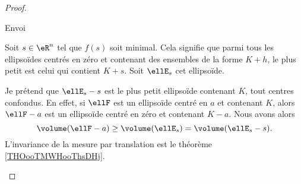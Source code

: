 \begin{proof}
\begin{subproof}
        \item[Envoi]

            Soit \( s\in \eR^n\) tel que \( f(s)\) soit minimal. Cela signifie que parmi tous les ellipsoïdes centrés en zéro et contenant des ensembles de la forme \( K+h\), le plus petit est celui qui contient \( K+s\). Soit \( \ellE_s\) cet ellipsoïde.

            Je prétend que \( \ellE_s-s\) est le plus petit ellipsoïde contenant \( K\), tout centres confondus. En effet, si \( \ellF\) est un ellipsoïde centré en \( a\) et contenant \( K\), alors \( \ellF-a\) est un ellipsoïde centré en zéro et contenant \( K-a\). Nous avons alors
            \begin{equation}
                \volume(\ellF-a)\geq \volume(\ellE_s)=\volume(\ellE_s-s).
            \end{equation}
            L'invariance de la mesure par translation est le théorème \ref{THOooTMWHooThsDHj}.
    \end{subproof}
\end{proof}

